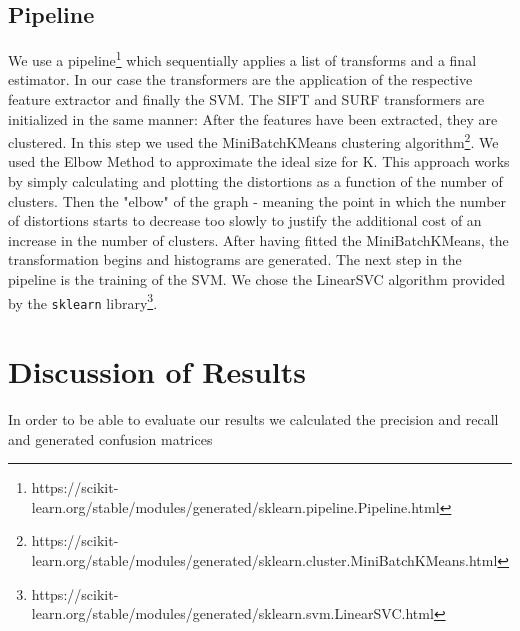 \documentclass{scrartcl}
\begin{document}
\subsection{Pipeline}
We use a pipeline\footnote{https://scikit-learn.org/stable/modules/generated/sklearn.pipeline.Pipeline.html} which sequentially applies a list of transforms and a final estimator.
In our case the transformers are the application of the respective feature extractor and finally the SVM.
The SIFT and SURF transformers are initialized in the same manner: After the features have been extracted, they are clustered.
In this step we used the MiniBatchKMeans clustering algorithm\footnote{https://scikit-learn.org/stable/modules/generated/sklearn.cluster.MiniBatchKMeans.html}. We used the Elbow Method to approximate the ideal size for K.
This approach works by simply calculating and plotting the distortions as a function of the number of clusters. Then the "elbow" of the graph - meaning the point in which the number of distortions starts to decrease too slowly to justify the additional cost of an increase in the number of clusters.
After having fitted the MiniBatchKMeans, the transformation begins and histograms are generated.
The next step in the pipeline is the training of the SVM. We chose the LinearSVC algorithm provided by the \texttt{sklearn} library\footnote{https://scikit-learn.org/stable/modules/generated/sklearn.svm.LinearSVC.html}.


\section{Discussion of Results}
In order to be able to evaluate our results we calculated the precision and recall and generated confusion matrices




\end{document}
